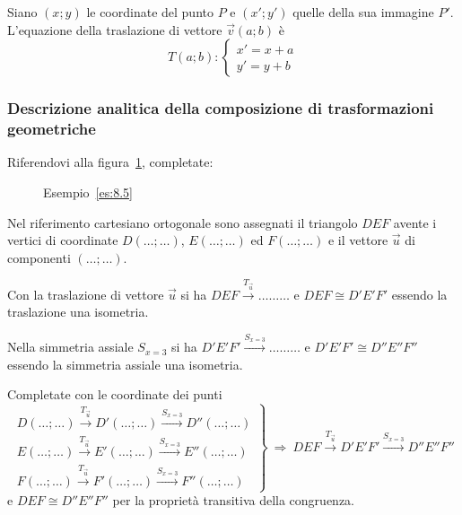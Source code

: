 Siano $(x;y)$ le coordinate del punto $P$ e $(x';y')$ quelle della 
sua immagine $P'$. L'equazione della traslazione di vettore 
$\vec{v}(a;b)$ è
\[T(a;b):\begin{cases}x'=x+a\\y'=y+b\end{cases}\]

\subsubsection{Descrizione analitica della composizione di 
trasformazioni geometriche}

\begin{esempio}\label{es:8.5}
Riferendovi alla figura~\ref{fig:es8.5}, completate:


\begin{inaccessibleblock}
\begin{figure}[!htb]
\centering
\caption{Esempio~\ref{es:8.5}}\label{fig:es8.5}
\end{figure}
\end{inaccessibleblock}

Nel riferimento cartesiano ortogonale sono assegnati il triangolo 
$DEF$ avente i vertici di coordinate $D(\ldots{};\ldots{})$, 
$E(\ldots{};\ldots{})$ ed $F(\ldots{};\ldots{})$ e il vettore 
$\vec{u}$ di componenti $(\ldots{};\ldots{})$.

Con la traslazione di vettore $\vec{u}$ si ha $DEF 
\overset{T_{\vec{u}}}\rightarrow \ldots\ldots\ldots{}$ e $DEF\cong 
D'E'F'$ essendo la traslazione una isometria.

Nella simmetria assiale $S_{x=3}$ si ha $D'E'F' 
\overset{S_{x=3}}\longrightarrow \ldots\ldots\ldots{}$ e $D'E'F'\cong 
D''E''F''$ essendo la simmetria assiale una isometria.

Completate con le coordinate dei punti
\[\left.\begin{array}{l}D(\ldots{};\ldots{}) 
\overset{T_{\vec{u}}}\rightarrow 
D'(\ldots{};\ldots{})\overset{S_{x=3}}\longrightarrow 
D''(\ldots{};\ldots{})\\
E(\ldots{};\ldots{}) \overset{T_{\vec{u}}}\rightarrow 
E'(\ldots{};\ldots{})\overset{S_{x=3}}\longrightarrow 
E''(\ldots{};\ldots{})\\
F(\ldots{};\ldots{}) \overset{T_{\vec{u}}}\rightarrow 
F'(\ldots{};\ldots{})\overset{S_{x=3}}\longrightarrow 
F''(\ldots{};\ldots{})\end{array} 
\right\}\:\Rightarrow\:DEF\overset{T_{\vec{u}}}\rightarrow 
D'E'F'\overset{S_{x=3}}\longrightarrow D''E''F''\]
e $DEF\cong D''E''F''$ per la proprietà transitiva della congruenza.
\end{esempio}

